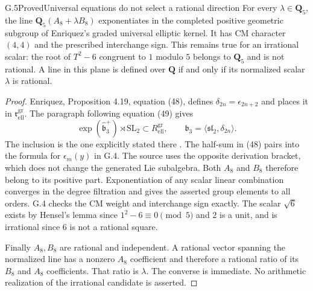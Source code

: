 \begin{statement}{G.5}{Proved}{Universal equations do not select a rational direction}
For every $\lambda\in\mathbf Q_5$, the line
$\mathbf Q_5(A_8+\lambda B_8)$ exponentiates in the completed
positive geometric subgroup of Enriquez's graded universal elliptic
kernel. It has CM character $(4,4)$ and the prescribed interchange
sign. This remains true for an irrational scalar: the root of
$T^2-6$ congruent to $1$ modulo $5$ belongs to $\mathbf Q_5$ and
is not rational. A line in this plane is defined over $\mathbf Q$
if and only if its normalized scalar $\lambda$ is rational.
\end{statement}
\begin{proof}
Enriquez, Proposition 4.19, equation (48), defines
$\delta_{2n}=\epsilon_{2n+2}$ and places it in
$\mathfrak r_{\mathrm{ell}}^{\mathrm{gr}}$.
The paragraph following equation (49) gives
\[
 \exp(\widehat{\mathfrak b}_3^+)\rtimes\mathrm{SL}_2
       \subset R_{\mathrm{ell}}^{\mathrm{gr}},\qquad
 \mathfrak b_3=\langle\mathfrak{sl}_2,\delta_{2n}\rangle
       .
\]
The inclusion is the one explicitly stated there \cite{fghEnriquez}.
The half-sum in (48) pairs into the formula for $\epsilon_m(y)$
in G.4. The source uses the opposite derivation bracket, which does
not change the generated Lie subalgebra. Both $A_8$ and $B_8$
therefore belong to its positive part. Exponentiation of any scalar
linear combination converges in the degree filtration and gives
the asserted group elements to all orders. G.4 checks the CM weight
and interchange sign exactly. The scalar $\sqrt6$ exists by Hensel's
lemma since $1^2-6\equiv0\pmod5$ and $2$ is a unit, and is
irrational since $6$ is not a rational square.

Finally $A_8,B_8$ are rational and independent. A rational vector
spanning the normalized line has a nonzero $A_8$ coefficient and
therefore a rational ratio of its $B_8$ and $A_8$ coefficients.
That ratio is $\lambda$. The converse is immediate. No arithmetic
realization of the irrational candidate is asserted.
\end{proof}

